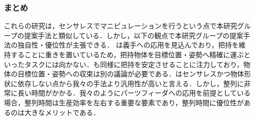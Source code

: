 \documentclass[a4paper,twoside,12pt,papersize, dvipdfmx]{iirthesis}
\begin{document}
\subsubsection{まとめ}
これらの研究は，センサレスでマニピュレーションを行うという点で本研究グループの提案手法と類似している．しかし，以下の観点で本研究グループの提案手法の独自性・優位性が主張できる．
\cite{ospina2020}は義手への応用を見込んでおり，把持を維持することに重きを置いているため，把持物体を目標位置・姿勢へ精確に運ぶといったタスクには向かない．\cite{tahara2013}\cite{tahara2020}も同様に把持を安定させることに注力しており，物体の目標位置・姿勢への収束は別の議論が必要である．\cite{mannam2019}はセンサレスかつ物体形状に依存しない点から我々の手法より汎用性が高いと言える．しかし，整列に非常に長い時間がかかる．我々のようにパーツフィーダへの応用を前提としている場合，整列時間は生産効率を左右する重要な要素であり，整列時間に優位性があるのは大きなメリットである．
\end{document}

